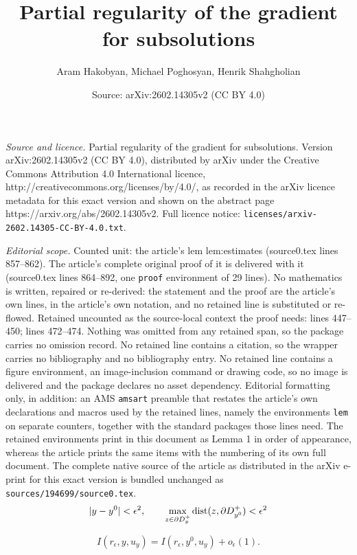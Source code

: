 \documentclass[10pt,a4paper]{amsart}
\title{Partial regularity of the gradient for subsolutions}
\author{Aram Hakobyan, Michael Poghosyan, Henrik Shahgholian}
\date{Source: arXiv:2602.14305v2 (CC BY 4.0)}
\begin{document}
\maketitle

\noindent\emph{Source and licence.} Partial regularity of the gradient for subsolutions. Version arXiv:2602.14305v2 (CC BY 4.0), distributed by arXiv under the Creative Commons Attribution 4.0 International licence, http://creativecommons.org/licenses/by/4.0/, as recorded in the arXiv licence metadata for this exact version and shown on the abstract page https://arxiv.org/abs/2602.14305v2. Full licence notice: \texttt{licenses/arxiv-2602.14305-CC-BY-4.0.txt}.\par\smallskip

\noindent\textit{Editorial scope.} Counted unit: the article's lem lem:estimates (source0.tex lines 857--862). The article's complete original proof of it is delivered with it (source0.tex lines 864--892, one \texttt{proof} environment of 29 lines). No mathematics is written, repaired or re-derived: the statement and the proof are the article's own lines, in the article's own notation, and no retained line is substituted or re-flowed.  Retained uncounted as the source-local context the proof needs: lines 447--450; lines 472--474.  Nothing was omitted from any retained span, so the package carries no omission record.  No retained line contains a citation, so the wrapper carries no bibliography and no bibliography entry.  No retained line contains a figure environment, an image-inclusion command or drawing code, so no image is delivered and the package declares no asset dependency.  Editorial formatting only, in addition: an AMS \texttt{amsart} preamble that restates the article's own declarations and macros used by the retained lines, namely the environments \texttt{lem} on separate counters, together with the standard packages those lines need.  The retained environments print in this document as Lemma 1 in order of appearance, whereas the article prints the same items with the numbering of its own full document.  The complete native source of the article as distributed in the arXiv e-print for this exact version is bundled unchanged as \texttt{sources/194699/source0.tex}.
\begin{equation}\label{eq:distance}
 |y - y^0| < \epsilon^2, \qquad 
\max_{z\in \partial D_{y}^+}{\hbox{dist}(z, \partial D_{y^0}^+)} < \epsilon^2
\end{equation}

\begin{equation}\label{eq:estimate}
    I(r_\epsilon,y,u_y) =  I(r_\epsilon,y^0,u_y) + o_\epsilon (1).
\end{equation}
\end{document}
